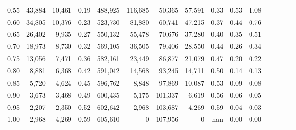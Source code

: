 \begin{tabular}{rrrcrrrrrrrrrrr}
0.55 &  43,884 &  10,461 &                                       0.19 &  488,925 &  116,685 &   50,365 &   57,591 &  0.33 &  0.53 &                         1.08 \\
0.60 &  34,805 &  10,376 &                                       0.23 &  523,730 &   81,880 &   60,741 &   47,215 &  0.37 &  0.44 &                         0.76 \\
0.65 &  26,402 &   9,935 &                                       0.27 &  550,132 &   55,478 &   70,676 &   37,280 &  0.40 &  0.35 &                         0.51 \\
0.70 &  18,973 &   8,730 &                                       0.32 &  569,105 &   36,505 &   79,406 &   28,550 &  0.44 &  0.26 &                         0.34 \\
0.75 &  13,056 &   7,471 &                                       0.36 &  582,161 &   23,449 &   86,877 &   21,079 &  0.47 &  0.20 &                         0.22 \\
0.80 &   8,881 &   6,368 &                                       0.42 &  591,042 &   14,568 &   93,245 &   14,711 &  0.50 &  0.14 &                         0.13 \\
0.85 &   5,720 &   4,624 &                                       0.45 &  596,762 &    8,848 &   97,869 &   10,087 &  0.53 &  0.09 &                         0.08 \\
0.90 &   3,673 &   3,468 &                                       0.49 &  600,435 &    5,175 &  101,337 &    6,619 &  0.56 &  0.06 &                         0.05 \\
0.95 &   2,207 &   2,350 &                                       0.52 &  602,642 &    2,968 &  103,687 &    4,269 &  0.59 &  0.04 &                         0.03 \\
1.00 &   2,968 &   4,269 &                                       0.59 &  605,610 &        0 &  107,956 &        0 &   nan &  0.00 &                         0.00 \\
\bottomrule
\end{tabular}
